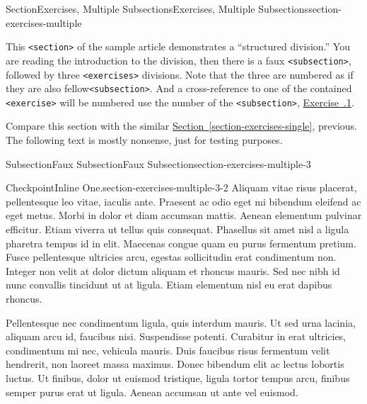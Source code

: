 \documentclass[twoside,10pt,]{article}
\newcommand{\xreffont}{\relax}
\newcommand{\mono}[1]{\texttt{#1}}
\numberwithin{equation}{section}
\begin{document}
%
%
\typeout{************************************************}
\typeout{************************************************}
%
\begin{sectionptx}{Section}{Exercises, Multiple Subsections}{}{Exercises, Multiple Subsections}{}{}{section-exercises-multiple}
\begin{introduction}{}%
This \mono{<section>} of the sample article demonstrates a ``structured division.''  You are reading the introduction to the division, then there is a faux \mono{<subsection>}, followed by three \mono{<exercises>} divisions.  Note that the three are numbered as if they are also fellow\mono{<subsection>}.  And a cross-reference to one of the contained \mono{<exercise>} will be numbered use the number of the \mono{<subsection>}, \hyperlink{exercise-challenging-one-structured}{Exercise~{\xreffont 38.3.1}}.%
\par
Compare this section with the similar \hyperref[section-exercises-single]{Section~{\xreffont\ref{section-exercises-single}}}, previous.  The following text is mostly nonsense, just for testing purposes.%
\end{introduction}%
%
%
\typeout{************************************************}
\typeout{************************************************}
%
\begin{subsectionptx}{Subsection}{Faux Subsection}{}{Faux Subsection}{}{}{section-exercises-multiple-3}
\begin{inlineexercise}{Checkpoint}{Inline One.}{section-exercises-multiple-3-2}%
Aliquam vitae risus placerat, pellentesque leo vitae, iaculis ante. Praesent ac odio eget mi bibendum eleifend ac eget metus. Morbi in dolor et diam accumsan mattis. Aenean elementum pulvinar efficitur. Etiam viverra ut tellus quis consequat. Phasellus sit amet nisl a ligula pharetra tempus id in elit. Maecenas congue quam eu purus fermentum pretium. Fusce pellentesque ultricies arcu, egestas sollicitudin erat condimentum non. Integer non velit at dolor dictum aliquam et rhoncus mauris. Sed nec nibh id nunc convallis tincidunt ut at ligula. Etiam elementum nisl eu erat dapibus rhoncus.%
\end{inlineexercise}%
Pellentesque nec condimentum ligula, quis interdum mauris. Ut sed urna lacinia, aliquam arcu id, faucibus nisi. Suspendisse potenti. Curabitur in erat ultricies, condimentum mi nec, vehicula mauris. Duis faucibus risus fermentum velit hendrerit, non laoreet massa maximus. Donec bibendum elit ac lectus lobortis luctus. Ut finibus, dolor ut euismod tristique, ligula tortor tempus arcu, finibus semper purus erat ut ligula. Aenean accumsan ut ante vel euismod.%

\end{subsectionptx}
\end{sectionptx}
\end{document}
